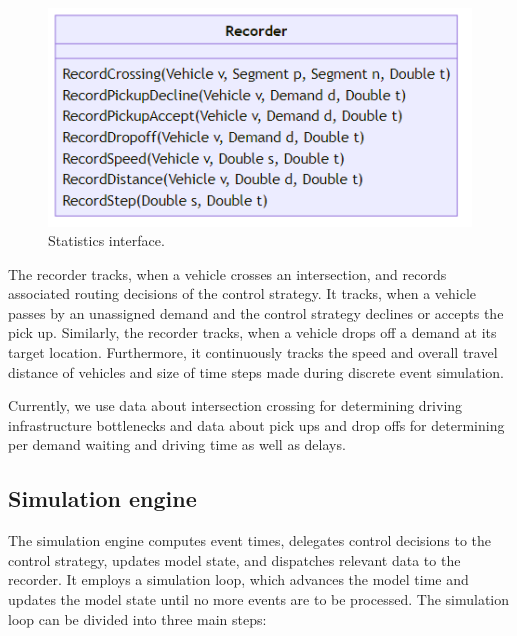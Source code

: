 \documentclass[a4paper,twoside]{article}
\begin{document}
	\begin{figure}[!ht]
		\centering
		\includegraphics[scale=0.3]{../../diagrams/statistics/classes-v2.png}
		\caption{Statistics interface.}
		\label{fig:statistics-interface}
	\end{figure}
	
	The recorder tracks, when a vehicle crosses an intersection, and records associated routing decisions of the control strategy.
	It tracks, when a vehicle passes by an unassigned demand and the control strategy declines or accepts the pick up.
	Similarly, the recorder tracks, when a vehicle drops off a demand at its target location.
	Furthermore, it continuously tracks the speed and overall travel distance of vehicles and size of time steps made during discrete event simulation.
	
	Currently, we use data about intersection crossing for determining driving infrastructure bottlenecks and data about pick ups and drop offs for determining per demand waiting and driving time as well as delays.
	
	\subsection{Simulation engine}
	\label{sec:simulation-engine}

	
	The simulation engine computes event times, delegates control decisions to the control strategy, updates model state, and dispatches relevant data to the recorder.
	It employs a simulation loop, which advances the model time and updates the model state until no more events are to be processed.
	The simulation loop can be divided into three main steps:
	
\end{document}
